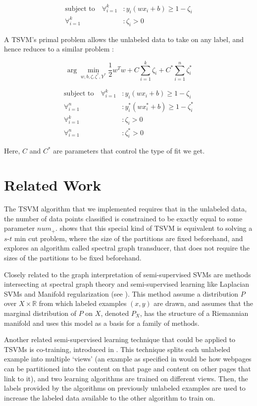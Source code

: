 \documentclass[11pt]{article}
\begin{document}
\begin{align*}
\textrm{subject to}\quad \forall_{i=1}^k&: y_i(wx_i+b)\geq 1-\zeta_i \\
\forall_{i=1}^k&: \zeta_i>0
\end{align*}

A TSVM's primal problem allows the unlabeled data to take on any label, and hence reduces to a similar problem \cite{Joachims:1999}:

\begin{equation}\label{eq:2}
\arg\min_{w, b, \zeta, \zeta^*, Y^*} \frac{1}{2}w^Tw+C\sum_{i=1}^k\zeta_i+C^*\sum_{i=1}^n\zeta^*_i
\end{equation}

\begin{align*}
\textrm{subject to}\quad \forall_{i=1}^k&: y_i(wx_i+b)\geq 1-\zeta_i \\
\forall_{i=1}^n&: y^*_i(wx^*_i+b)\geq 1-\zeta^*_i \\
\forall_{i=1}^k&: \zeta_i>0 \\
\forall_{i=1}^n&: \zeta^*_i>0
\end{align*}

Here, $C$ and $C^*$ are parameters that control the type of fit we get.

\section{Related Work}

The TSVM algorithm that we implemented requires that in the unlabeled
data, the number of data points classified is constrained to be
exactly equal to some parameter $num_+$. \cite{joachims2003transductive}
shows that this special kind of TSVM is equivalent to solving
a $s$-$t$ min cut problem, where the size of the partitions are fixed beforehand, and explores an algorithm called spectral graph transducer,
that does not require the sizes of the partitions to be fixed beforehand.

Closely related to the graph interpretation of semi-supervised SVMs
are methods intersecting at spectral graph theory and semi-supervised
learning like Laplacian SVMs and Manifold regularization
(see \cite{belkin2005manifold}). This method assume a distribution $P$
over $X\times \mathbb{R}$ from which labeled examples $(x,y)$ are drawn,
and assumes that the marginal distribution of $P$ on $X$, denoted $P_X$,
has the structure of a Riemannian manifold and uses this model
as a basis for a family of methods.

Another related semi-supervised learning technique that could
be applied to TSVMs is co-training, introduced in
\cite{blum1998combining}. This technique splits each unlabeled
example into multiple `views' (an example as specified in \cite{blum1998combining} would be how webpages can be partitioned into
the content on that page and content on other pages that link to it),
and two learning algorithms are trained on different views. Then,
the labels provided by the algorithms on previously unlabeled examples
are used to increase the labeled data available to the other
algorithm to train on.
\end{document}

